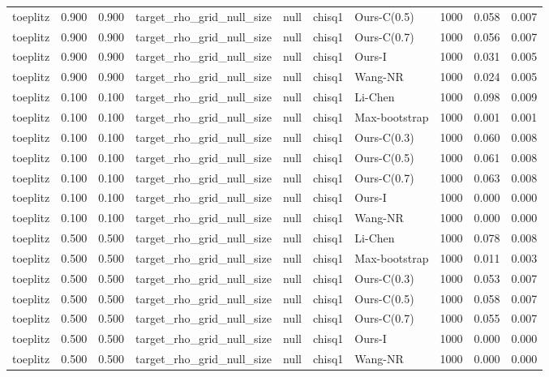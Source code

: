 \begin{tabular}{lrrllllrrr}
toeplitz & 0.900 & 0.900 & target\_rho\_grid\_null\_size & null & chisq1 & Ours-C(0.5) & 1000 & 0.058 & 0.007 \\
toeplitz & 0.900 & 0.900 & target\_rho\_grid\_null\_size & null & chisq1 & Ours-C(0.7) & 1000 & 0.056 & 0.007 \\
toeplitz & 0.900 & 0.900 & target\_rho\_grid\_null\_size & null & chisq1 & Ours-I & 1000 & 0.031 & 0.005 \\
toeplitz & 0.900 & 0.900 & target\_rho\_grid\_null\_size & null & chisq1 & Wang-NR & 1000 & 0.024 & 0.005 \\
toeplitz & 0.100 & 0.100 & target\_rho\_grid\_null\_size & null & chisq1 & Li-Chen & 1000 & 0.098 & 0.009 \\
toeplitz & 0.100 & 0.100 & target\_rho\_grid\_null\_size & null & chisq1 & Max-bootstrap & 1000 & 0.001 & 0.001 \\
toeplitz & 0.100 & 0.100 & target\_rho\_grid\_null\_size & null & chisq1 & Ours-C(0.3) & 1000 & 0.060 & 0.008 \\
toeplitz & 0.100 & 0.100 & target\_rho\_grid\_null\_size & null & chisq1 & Ours-C(0.5) & 1000 & 0.061 & 0.008 \\
toeplitz & 0.100 & 0.100 & target\_rho\_grid\_null\_size & null & chisq1 & Ours-C(0.7) & 1000 & 0.063 & 0.008 \\
toeplitz & 0.100 & 0.100 & target\_rho\_grid\_null\_size & null & chisq1 & Ours-I & 1000 & 0.000 & 0.000 \\
toeplitz & 0.100 & 0.100 & target\_rho\_grid\_null\_size & null & chisq1 & Wang-NR & 1000 & 0.000 & 0.000 \\
toeplitz & 0.500 & 0.500 & target\_rho\_grid\_null\_size & null & chisq1 & Li-Chen & 1000 & 0.078 & 0.008 \\
toeplitz & 0.500 & 0.500 & target\_rho\_grid\_null\_size & null & chisq1 & Max-bootstrap & 1000 & 0.011 & 0.003 \\
toeplitz & 0.500 & 0.500 & target\_rho\_grid\_null\_size & null & chisq1 & Ours-C(0.3) & 1000 & 0.053 & 0.007 \\
toeplitz & 0.500 & 0.500 & target\_rho\_grid\_null\_size & null & chisq1 & Ours-C(0.5) & 1000 & 0.058 & 0.007 \\
toeplitz & 0.500 & 0.500 & target\_rho\_grid\_null\_size & null & chisq1 & Ours-C(0.7) & 1000 & 0.055 & 0.007 \\
toeplitz & 0.500 & 0.500 & target\_rho\_grid\_null\_size & null & chisq1 & Ours-I & 1000 & 0.000 & 0.000 \\
toeplitz & 0.500 & 0.500 & target\_rho\_grid\_null\_size & null & chisq1 & Wang-NR & 1000 & 0.000 & 0.000 \\

\end{tabular}

